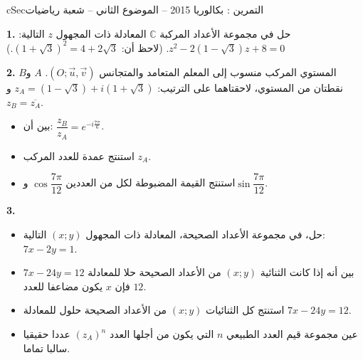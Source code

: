 \documentclass[12pt,a4paper]{article}
\newenvironment{BOX}[2]{\begin{otherlanguage}{english}\begin{arbox}{#1}{#2}}{\end{arbox}\end{otherlanguage}}
\newcounter{exo}
\newenvironment{tamrin}[1]{\stepcounter{exo}\begin{BOX}{cSec}{التمرين \theexo: #1}}{\end{BOX}}
\newenvironment{sq}{\begin{itemize}[leftmargin=2.4em,itemsep=3pt]}{\end{itemize}}
\newcommand{\qa}{\item[(أ)]}\newcommand{\qb}{\item[(ب)]}\newcommand{\qc}{\item[(جـ)]}\newcommand{\qd}{\item[(د)]}\newcommand{\qe}{\item[(هـ)]}
\newcommand{\QQ}[1]{\par\smallskip\textbf{#1.} }
\begin{document}
\begin{tamrin}{بكالوريا 2015 -- الموضوع الثاني -- شعبة رياضيات}
\QQ{1} حل في مجموعة الأعداد المركبة $\mathbb{C}$ المعادلة ذات المجهول $z$ التالية: $z^2-2\left(1-\sqrt3\right)z+8=0$.
(لاحظ أن: $\left(1+\sqrt3\right)^2=4+2\sqrt3$.)

\QQ{2} المستوي المركب منسوب إلى المعلم المتعامد والمتجانس $\left(O;\vec u,\vec v\right)$.
$A$ و$B$ نقطتان من المستوي، لاحقتاهما على الترتيب: $z_A=\left(1-\sqrt3\right)+i\left(1+\sqrt3\right)$ و$z_B=\overline{z_A}$.
\begin{sq}
\qa بين أن: $\dfrac{z_B}{z_A}=e^{-i\frac{7\pi}{6}}$.
\qb استنتج عمدة للعدد المركب $z_A$.
\qc استنتج القيمة المضبوطة لكل من العددين $\cos\dfrac{7\pi}{12}$ و$\sin\dfrac{7\pi}{12}$.
\end{sq}
\QQ{3}
\begin{sq}
\qa حل، في مجموعة الأعداد الصحيحة، المعادلة ذات المجهول $(x;y)$ التالية: $7x-2y=1$.
\qb بين أنه إذا كانت الثنائية $(x;y)$ من الأعداد الصحيحة حلا للمعادلة $7x-24y=12$ فإن $x$ يكون مضاعفا للعدد $12$.
\qc استنتج كل الثنائيات $(x;y)$ من الأعداد الصحيحة حلول للمعادلة $7x-24y=12$.
\qd عين مجموعة قيم العدد الطبيعي $n$ التي يكون من أجلها العدد $\left(z_A\right)^n$ عددا حقيقيا سالبا تماما.
\end{sq}
\end{tamrin}
\end{document}
